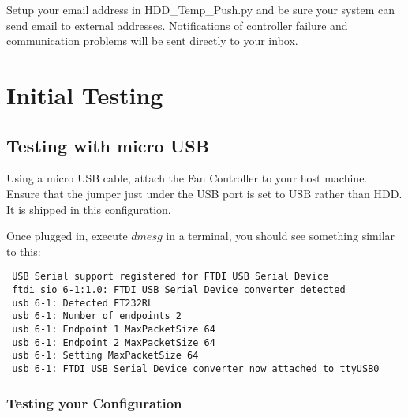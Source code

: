\documentclass[10pt,letterpaper]{report}
\begin{document}
Setup your email address in HDD\_Temp\_Push.py and be sure your system can send email to external addresses. Notifications of controller failure and communication problems will be sent directly to your inbox.

\section{Initial Testing}


\subsection{Testing with micro USB}

Using a micro USB cable, attach the Fan Controller to your host machine. Ensure that the jumper just under the USB port is set to USB rather than HDD. It is shipped in this configuration.

Once plugged in, execute $dmesg$ in a terminal, you should see something similar to this:
%
\begin{verbatim}
 USB Serial support registered for FTDI USB Serial Device
 ftdi_sio 6-1:1.0: FTDI USB Serial Device converter detected
 usb 6-1: Detected FT232RL
 usb 6-1: Number of endpoints 2
 usb 6-1: Endpoint 1 MaxPacketSize 64
 usb 6-1: Endpoint 2 MaxPacketSize 64
 usb 6-1: Setting MaxPacketSize 64
 usb 6-1: FTDI USB Serial Device converter now attached to ttyUSB0

\end{verbatim}

\subsubsection{Testing your Configuration}
\end{document}
